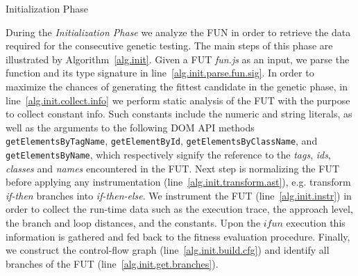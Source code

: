 \documentclass[sigconf]{acmart}
\begin{document}
\begin{algorithm}[t!]
  \caption{Initialization Phase}
  \label{alg.init}
  \scriptsize
  \DontPrintSemicolon
  \SetAlgoVlined
\end{algorithm}

During the \emph{Initialization Phase} we analyze the FUN in order to retrieve the data required for the consecutive genetic testing. The main steps of this phase are illustrated by Algorithm~\ref{alg.init}. Given a FUT \emph{fun.js} as an input, we parse the function and its type signature in line~\ref{alg.init.parse.fun.sig}. In order to maximize the chances of generating the fittest candidate in the genetic phase, in line~\ref{alg.init.collect.info} we perform static analysis of the FUT with the purpose to collect constant info. Such constants include the numeric and string literals, as well as the arguments to the following DOM API methods \texttt{getElementsByTagName}, \texttt{getElementById}, \texttt{getElementsByClassName}, and \texttt{getElementsByName},
which respectively signify the reference to the \emph{tags}, \emph{ids}, \emph{classes} and \emph{names} encountered in the FUT. Next step is normalizing the FUT before applying any instrumentation (line~\ref{alg.init.transform.ast}), e.g. transform \emph{if-then} branches into \emph{if-then-else}. We instrument the FUT (line~\ref{alg.init.instr}) in order to collect the run-time data such as the execution trace, the approach level, the branch and loop distances, and the constants. Upon the $ifun$ execution this information is gathered and fed back to the fitness evaluation procedure. Finally, we construct the control-flow graph (line~\ref{alg.init.build.cfg}) and identify all branches of the FUT (line~\ref{alg.init.get.branches}).
\end{document}
